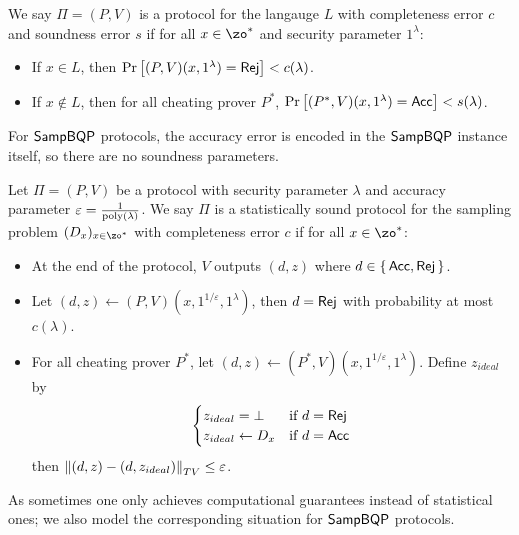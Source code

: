\begin{definition}
	We say $\Pi=(P, V)$ is a protocol for the langauge $L$ with completeness error $c$ and soundness error $s$ if for all $x\in\zo^*$ and security parameter $1^\lambda$:
	\begin{itemize}
		\item If $x\in L$, then $\Pr\left[(P, V)(x, 1^\lambda)=\mathsf{Rej}\right]<c(\lambda)$.
		\item If $x\notin L$, then for all cheating prover $P^*$, $\Pr\left[(P^*, V)(x, 1^\lambda)=\mathsf{Acc}\right]<s(\lambda)$.
	\end{itemize}
\end{definition}

For $\operatorname{\mathsf{SampBQP}}$ protocols, the accuracy error is encoded in the $\operatorname{\mathsf{SampBQP}}$ instance itself, so there are no soundness parameters.

\begin{definition}
	Let $\Pi=(P, V)$ be a protocol with security parameter $\lambda$ and accuracy parameter $\varepsilon=\frac{1}{\operatorname*{\operatorname{poly}}(\lambda)}$.
	We say $\Pi$ is a statistically sound protocol for the sampling problem $(D_x)_{x\in\zo^*}$ with completeness error $c$ if for all $x\in\zo^*$:
	\begin{itemize}
		\item At the end of the protocol, $V$ outputs $(d, z)$ where $d\in\set{\mathsf{Acc}, \mathsf{Rej}}$.
		\item Let $(d, z)\leftarrow(P, V)(x, 1^{1/\varepsilon}, 1^\lambda)$, then $d=\mathsf{Rej}$ with probability at most $c(\lambda)$.
		\item For all cheating prover $P^*$, let $(d, z)\leftarrow(P^*, V)(x, 1^{1/\varepsilon}, 1^\lambda)$.
			Define $z_{ideal}$ by
			$$\begin{cases}
				z_{ideal}=\bot & \text{if } d=\mathsf{Rej}\\
				z_{ideal}\leftarrow D_x & \text{if } d=\mathsf{Acc}
			\end{cases}$$
			then $\left\lVert(d,z)-(d,z_{ideal})\right\rVert_{TV}\leq\varepsilon$.
	\end{itemize}
\end{definition}

As sometimes one only achieves computational guarantees instead of statistical ones;
we also model the corresponding situation for $\operatorname{\mathsf{SampBQP}}$ protocols.


